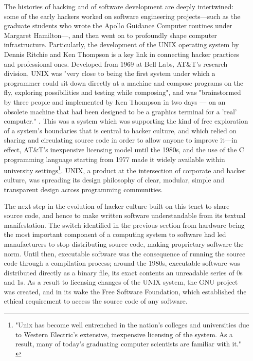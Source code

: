 The histories of hacking and of software development are deeply intertwined: some of the early hackers worked on software engineering projects—such as the graduate students who wrote the Apollo Guidance Computer routines under Margaret Hamilton—, and then went on to profoundly shape computer infrastructure. Particularly, the development of the UNIX operating system by Dennis Ritchie and Ken Thompson is a key link in connecting hacker practices and professional ones. Developed from 1969 at Bell Labs, AT\&T's research division, UNIX was "very close to being the first system under which a programmer could sit down directly at a machine and compose programs on the fly, exploring possibilities and testing while composing", and was "brainstormed by three people and implemented by Ken Thompson in two days — on an obsolete machine that had been designed to be a graphics terminal for a 'real' computer." \citep{raymond_art_2003}.  This was a system which was supporting the kind of free exploration of a system's boundaries that is central to hacker culture, and which relied on sharing and circulating source code in order to allow anyone to improve it—in effect, AT\&T's inexpensive licensing model until the 1980s, and the use of the C programming language starting from 1977 made it widely available within university settings\footnote{"Unix has become well entrenched in the nation's colleges and universities due to Western Electric's extensive, inexpensive licensing of the system. As a result, many of today's graduating computer scientists are familiar with it." \citep{morgan_ibm_1982}}. UNIX, a product at the intersection of corporate and hacker culture, was spreading its design philosophy of clear, modular, simple and transparent design across programming communities.

The next step in the evolution of hacker culture built on this tenet to share source code, and hence to make written software understandable from its textual manifestation. The switch identified in the previous section from hardware being the most important component of a computing system to software had led manufacturers to stop distributing source code, making proprietary software the norm. Until then, executable software was the consequence of running the source code through a compilation process; around the 1980s, executable software was distributed directly as a binary file, its exact contents an unreadable series of 0s and 1s. As a result to licensing changes of the UNIX system, the GNU project was created, and in its wake the Free Software Foundation, which established the ethical requirement to access the source code of any software.

